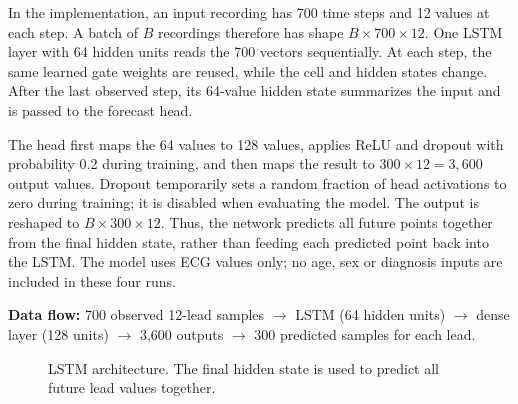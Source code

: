 \documentclass[11pt,a4paper]{article}
\begin{document}
In the implementation, an input recording has 700 time steps and 12 values at each step. A batch of $B$ recordings therefore has shape $B\times700\times12$. One LSTM layer with 64 hidden units reads the 700 vectors sequentially. At each step, the same learned gate weights are reused, while the cell and hidden states change. After the last observed step, its 64-value hidden state summarizes the input and is passed to the forecast head.

The head first maps the 64 values to 128 values, applies ReLU and dropout with probability 0.2 during training, and then maps the result to $300\times12=3{,}600$ output values. Dropout temporarily sets a random fraction of head activations to zero during training; it is disabled when evaluating the model. The output is reshaped to $B\times300\times12$. Thus, the network predicts all future points together from the final hidden state, rather than feeding each predicted point back into the LSTM. The model uses ECG values only; no age, sex or diagnosis inputs are included in these four runs.

\textbf{Data flow:} 700 observed 12-lead samples $\rightarrow$ LSTM (64 hidden units) $\rightarrow$ dense layer (128 units) $\rightarrow$ 3,600 outputs $\rightarrow$ 300 predicted samples for each lead.
\begin{figure}[H]
\centering
{}
\caption{LSTM architecture. The final hidden state is used to predict all future lead values together.}
\label{fig:lstm_arch}
\end{figure}
\end{document}
